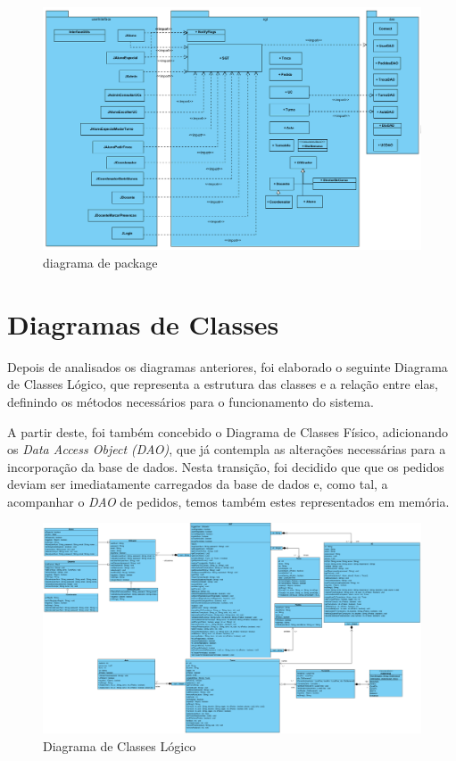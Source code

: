 \documentclass[12pt,a4paper]{report}
\begin{document}
\paragraph{}
\begin{figure}[H]
	\centering 
	\includegraphics[width=\textwidth]{modelacao/PackageDiag.png}  
	\caption{diagrama de package}
\end{figure}

\chapter{Diagramas de Classes}
Depois de analisados os diagramas anteriores, foi elaborado o seguinte Diagrama de Classes Lógico, que representa a estrutura das classes e a relação entre elas, definindo os métodos necessários para o funcionamento do sistema.

A partir deste, foi também concebido o Diagrama de Classes Físico, adicionando os \textit{Data Access Object (DAO)}, que já contempla as alterações necessárias para a incorporação da base de dados. Nesta transição, foi decidido que que os pedidos deviam ser imediatamente carregados da base de dados e, como tal, a acompanhar o \textit{DAO} de pedidos, temos também estes representados em memória.

\begin{landscape}
\begin{figure}[H]
	\centering 
	\includegraphics[width=1.5\textwidth]{modelacao/diagramas_de_classe/diagrama_classes_logico.png}  
	\caption{Diagrama de Classes Lógico}
\end{figure}
\vfill
\thispagestyle{empty}
\raisebox{0px}{\makebox[\linewidth]{\thepage}}
\end{landscape} 
\end{document}
